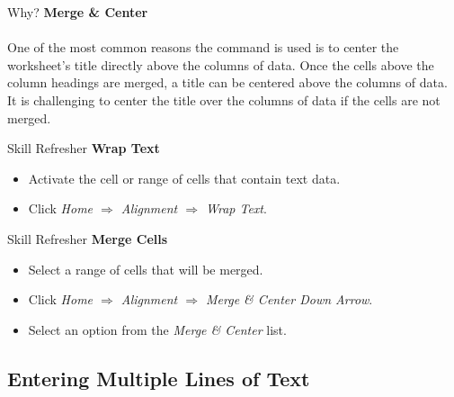 \begin{center}
	\begin{infobox}{Why?}
		\textbf{Merge \& Center}
		\\
		\\
		One of the most common reasons the  command is used is to center the worksheet's title directly above the columns of data. Once the cells above the column headings are merged, a title can be centered above the columns of data. It is challenging to center the title over the columns of data if the cells are not merged.
	\end{infobox}
\end{center}

\begin{center}
	\begin{sklbox}{Skill Refresher}
		\textbf{Wrap Text}
		\\
		\begin{itemize}
			\setlength{\itemsep}{0pt}
			\setlength{\parskip}{0pt}
			\setlength{\parsep}{0pt}
			
			\item Activate the cell or range of cells that contain text data.
			\item Click \textit{Home $ \Rightarrow $ Alignment $ \Rightarrow $ Wrap Text}.
			
		\end{itemize}
	\end{sklbox}
\end{center}

\begin{center}
	\begin{sklbox}{Skill Refresher}
		\textbf{Merge Cells}
		\\
		\begin{itemize}
			\setlength{\itemsep}{0pt}
			\setlength{\parskip}{0pt}
			\setlength{\parsep}{0pt}
			
			\item Select a range of cells that will be merged.
			\item Click \textit{Home $ \Rightarrow $ Alignment $ \Rightarrow $ Merge \& Center Down Arrow}.
			\item Select an option from the \textit{Merge \& Center} list.
			
		\end{itemize}
	\end{sklbox}
\end{center}

\subsection{Entering Multiple Lines of Text}

